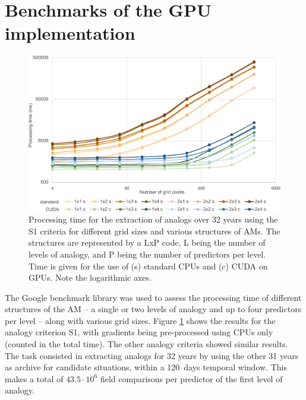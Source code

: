 \documentclass[draft]{agujournal2019}
\begin{document}


%
%

\appendix

\section{Benchmarks of the GPU implementation}

\begin{figure}
	\noindent\includegraphics[width=130mm]{figures/cuda-timing.pdf}
	\caption{Processing time for the extraction of analogs over 32 years using the S1 criteria for different grid sizes and various structures of AMs. The structures are represented by a LxP code, L being the number of levels of analogy, and P being the number of predictors per level. Time is given for the use of (s) standard CPUs and (c) CUDA on GPUs. Note the logarithmic axes.}
	\label{cuda}
\end{figure}

The Google benchmark library was used to assess the processing time of different structures of the AM -- a single or two levels of analogy and up to four predictors per level -- along with various grid sizes. Figure \ref{cuda} shows the results for the analogy criterion S1, with gradients being pre-processed using CPUs only (counted in the total time). The other analogy criteria showed similar results. The task consisted in extracting analogs for 32 years by using the other 31 years as archive for candidate situations, within a 120~days temporal window. This makes a total of $43.5\cdot10^6$ field comparisons per predictor of the first level of analogy.
\end{document}
